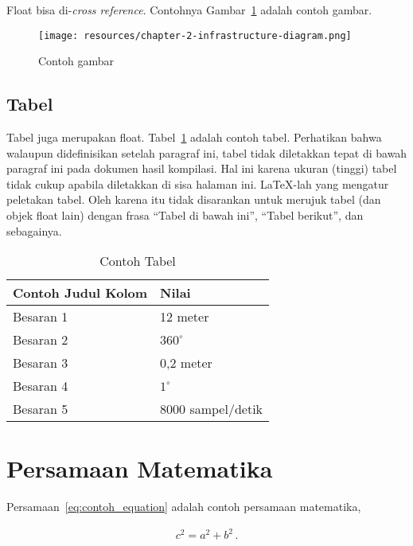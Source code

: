 Float bisa di-\textit{cross reference}. Contohnya Gambar~\ref{fig:contoh_gambar} adalah contoh gambar.

\begin{figure}[h]
    \centering
    \texttt{[image: resources/chapter-2-infrastructure-diagram.png]}
    \caption{Contoh gambar}
    \label{fig:contoh_gambar}
\end{figure}

\subsection{Tabel}

Tabel juga merupakan float. Tabel~\ref{table:contoh_tabel} adalah contoh tabel. Perhatikan bahwa walaupun didefinisikan setelah paragraf ini, tabel tidak diletakkan tepat di bawah paragraf ini pada dokumen hasil kompilasi. Hal ini karena ukuran (tinggi) tabel tidak cukup apabila diletakkan di sisa halaman ini. \LaTeX-lah yang mengatur peletakan tabel. Oleh karena itu tidak disarankan untuk merujuk tabel (dan objek float lain) dengan frasa ``Tabel di bawah ini'', ``Tabel berikut'', dan sebagainya.

\begin{table}[htbp]
    \centering
    \caption{Contoh Tabel}
    \label{table:contoh_tabel}
    \begin{tabular}{ll}
        \toprule
        \multicolumn{1}{l}{\textbf{Contoh Judul Kolom}} & \multicolumn{1}{l}{\textbf{Nilai}}\\
        \midrule
        Besaran 1 & 12 meter          \\
        Besaran 2 & $360^\circ$       \\
        Besaran 3 & 0,2 meter         \\
        Besaran 4 & $1^\circ$         \\
        Besaran 5 & 8000 sampel/detik \\
        \bottomrule
    \end{tabular}
\end{table}

\section{Persamaan Matematika}

Persamaan~\eqref{eq:contoh_equation} adalah contoh persamaan matematika,

\begin{align}
    c^2 = a^2 + b^2\,.
\label{eq:contoh_equation}
\end{align}

